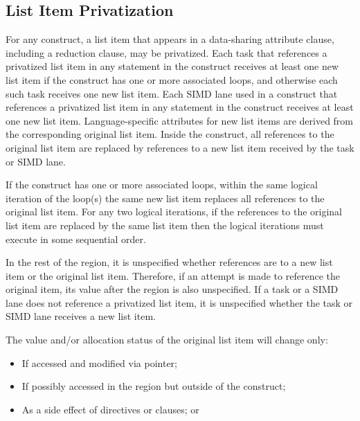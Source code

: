 \subsection{List Item Privatization}
\label{subsec:List Item Privatization}

For any construct, a list item that appears in a data-sharing attribute
clause, including a reduction clause, may be privatized. Each task that
references a privatized list item in any statement in the construct receives
at least one new list item if the construct has one or more associated loops,
and otherwise each such task receives one new list item.  Each SIMD lane used
in a  construct that references a privatized list item in any
statement in the construct receives at least one new list item.
Language-specific attributes for new list items are derived from the
corresponding original list item. Inside the construct, all references to the
original list item are replaced by references to a new list item received by
the task or SIMD lane.  

If the construct has one or more associated loops, within the same logical
iteration of the loop(s) the same new list item replaces all references to the
original list item. For any two logical iterations, if the references to the
original list item are replaced by the same list item then the logical
iterations must execute in some sequential order.

In the rest of the region, it is unspecified whether references are
to a new list item or the original list item. Therefore, if an attempt is made
to reference the original item, its value after the region is also
unspecified. If a task or a SIMD lane does not reference a privatized list
item, it is unspecified whether the task or SIMD lane receives a new list
item.

The value and/or allocation status of the original list item will change only:

\begin{itemize}
\item If accessed and modified via pointer;
\item If possibly accessed in the region but outside of the construct;
\item As a side effect of directives or clauses; or

\end{itemize}

